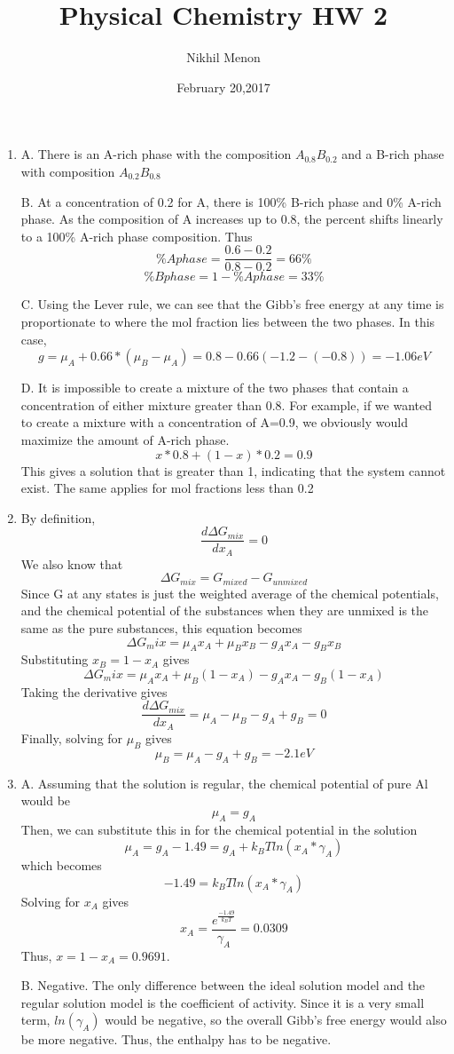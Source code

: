 \documentclass{article}
\title{Physical Chemistry HW 2}
\author{Nikhil Menon}
\date{February 20,2017}
\begin{document}
\maketitle
\begin{enumerate}
\item  
A. There is an A-rich phase with the composition $A_{0.8}B_{0.2}$ and a B-rich phase with composition $A_{0.2}B_{0.8}$

B. At a concentration of 0.2 for A, there is 100\% B-rich phase and 0\% A-rich phase. As the composition of A increases up to 0.8, the percent shifts linearly to a 100\% A-rich phase composition. Thus
$$\% A phase = \frac{0.6-0.2}{0.8-0.2}=66\%$$
$$\% B phase = 1 - \% A phase =33\%$$

C. Using the Lever rule, we can see that the Gibb's free energy at any time is
proportionate to where the mol fraction lies between the two phases. In this case,
$$g=\mu_A+0.66*(\mu_B-\mu_A)=0.8-0.66(-1.2-(-0.8))=-1.06 eV$$

D. It is impossible to create a mixture of the two phases that contain a concentration of either mixture greater than 0.8. For example, if we wanted to create a mixture with a concentration of A=0.9, we obviously would maximize the amount of A-rich phase. 
$$x*0.8+(1-x)*0.2=0.9$$
This gives a solution that is greater than 1, indicating that the system cannot exist. The same applies for mol fractions less than 0.2

\item 
By definition,
$$\frac{d\Delta G_{mix}}{dx_A}=0$$
We also know that
$$\Delta G_{mix}=G_{mixed}-G_{unmixed}$$
Since G at any states is just the weighted average of the chemical potentials, and the chemical potential of the substances when they are unmixed is the same as the pure substances, this equation becomes
$$\Delta G_mix=\mu_Ax_A+\mu_Bx_B-g_Ax_A-g_Bx_B$$
Substituting $x_B=1-x_A$ gives 
$$\Delta G_mix=\mu_Ax_A+\mu_B(1-x_A)-g_Ax_A-g_B(1-x_A)$$
Taking the derivative gives
$$\frac{d\Delta G_{mix}}{dx_A}=\mu_A-\mu_B-g_A+g_B=0$$
Finally, solving for $\mu_B$ gives
$$\mu_B=\mu_A-g_A+g_B=-2.1 eV$$

\item 
A. Assuming that the solution is regular, the chemical potential of pure Al would be
$$\mu_A=g_A$$
Then, we can substitute this in for the chemical potential in the solution
$$\mu_A=g_A-1.49=g_A+k_BTln(x_A*\gamma_A)$$
which becomes
$$-1.49=k_BTln(x_A*\gamma_A)$$
Solving for $x_A$ gives
$$x_A=\frac{e^{\frac{-1.49}{k_BT}}}{\gamma_A}=0.0309$$
Thus, $x=1-x_A=0.9691$.

B. Negative. The only difference between the ideal solution model and the regular solution model is the coefficient of activity. Since it is a very small term, $ln(\gamma_A)$ would be negative, so the overall Gibb's free energy would also be more negative. Thus, the enthalpy has to be negative.
\end{enumerate}
\end{document}
